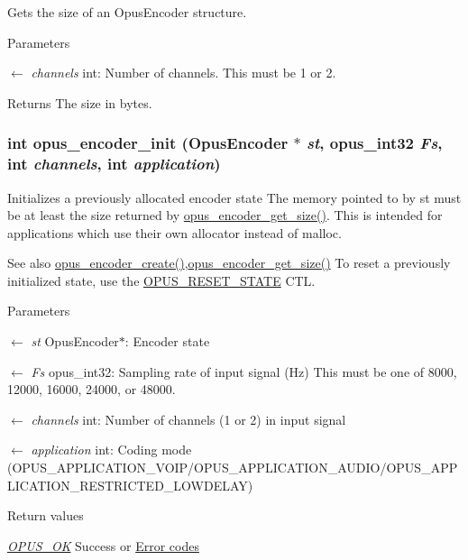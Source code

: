 Gets the size of an {\ttfamily OpusEncoder} structure. 
\begin{DoxyParams}{Parameters}
\item[\mbox{$\leftarrow$} {\em channels}]{\ttfamily int}: Number of channels. This must be 1 or 2. \end{DoxyParams}
\begin{DoxyReturn}{Returns}
The size in bytes. 
\end{DoxyReturn}
\hypertarget{group__opus__encoder_ga515db1c267a7421dacaad3610f79eb79}{
\subsubsection[{opus\_\-encoder\_\-init}]{\setlength{\rightskip}{0pt plus 5cm}int opus\_\-encoder\_\-init ({\bf OpusEncoder} $\ast$ {\em st}, \/  {\bf opus\_\-int32} {\em Fs}, \/  int {\em channels}, \/  int {\em application})}}
\label{group__opus__encoder_ga515db1c267a7421dacaad3610f79eb79}


Initializes a previously allocated encoder state The memory pointed to by st must be at least the size returned by \hyperlink{group__opus__encoder_gaefeb7dc1d6e3b59dea5ea674c86e9c18}{opus\_\-encoder\_\-get\_\-size()}. This is intended for applications which use their own allocator instead of malloc. \begin{DoxySeeAlso}{See also}
\hyperlink{group__opus__encoder_gaa89264fd93c9da70362a0c9b96b9ca88}{opus\_\-encoder\_\-create()},\hyperlink{group__opus__encoder_gaefeb7dc1d6e3b59dea5ea674c86e9c18}{opus\_\-encoder\_\-get\_\-size()} To reset a previously initialized state, use the \hyperlink{group__opus__genericctls_gadc74e4fa8bcdf9994187d52d92207337}{OPUS\_\-RESET\_\-STATE} CTL. 
\end{DoxySeeAlso}

\begin{DoxyParams}{Parameters}
\item[\mbox{$\leftarrow$} {\em st}]{\ttfamily OpusEncoder$\ast$}: Encoder state \item[\mbox{$\leftarrow$} {\em Fs}]{\ttfamily opus\_\-int32}: Sampling rate of input signal (Hz) This must be one of 8000, 12000, 16000, 24000, or 48000. \item[\mbox{$\leftarrow$} {\em channels}]{\ttfamily int}: Number of channels (1 or 2) in input signal \item[\mbox{$\leftarrow$} {\em application}]{\ttfamily int}: Coding mode (OPUS\_\-APPLICATION\_\-VOIP/OPUS\_\-APPLICATION\_\-AUDIO/OPUS\_\-APPLICATION\_\-RESTRICTED\_\-LOWDELAY) \end{DoxyParams}

\begin{DoxyRetVals}{Return values}
\item[{\em \hyperlink{group__opus__errorcodes_gaa44cf8a185e1b5cb940ef63eb4f02d21}{OPUS\_\-OK}}]Success or \hyperlink{group__opus__errorcodes}{Error codes} \end{DoxyRetVals}
